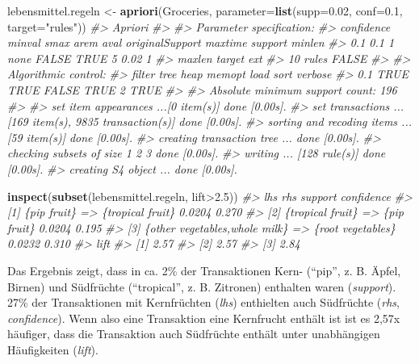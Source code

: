 \documentclass[12pt,]{book}
\makeatletter
\newenvironment{Shaded}{\begin{snugshade}}{\end{snugshade}}
\newcommand{\KeywordTok}[1]{\textcolor[rgb]{0.13,0.29,0.53}{\textbf{{#1}}}}
\newcommand{\DataTypeTok}[1]{\textcolor[rgb]{0.13,0.29,0.53}{{#1}}}
\newcommand{\FloatTok}[1]{\textcolor[rgb]{0.00,0.00,0.81}{{#1}}}
\newcommand{\StringTok}[1]{\textcolor[rgb]{0.31,0.60,0.02}{{#1}}}
\newcommand{\CommentTok}[1]{\textcolor[rgb]{0.56,0.35,0.01}{\textit{{#1}}}}
\newcommand{\NormalTok}[1]{{#1}}
\newenvironment{kframe}{%
\medskip{}
\setlength{\fboxsep}{.8em}
 \def\at@end@of@kframe{}%
 \ifinner\ifhmode%
  \def\at@end@of@kframe{\end{minipage}}%
  \begin{minipage}{\columnwidth}%
 \fi\fi%
 \def\FrameCommand##1{\hskip\@totalleftmargin \hskip-\fboxsep
 \colorbox{shadecolor}{##1}\hskip-\fboxsep
     \hskip-\linewidth \hskip-\@totalleftmargin \hskip\columnwidth}%
 \MakeFramed {\advance\hsize-\width
   \@totalleftmargin\z@ \linewidth\hsize
   \@setminipage}}%
 {\par\unskip\endMakeFramed%
 \at@end@of@kframe}
\renewenvironment{Shaded}{\begin{kframe}}{\end{kframe}}
\makeatother
\begin{document}
\begin{Shaded}
\begin{Highlighting}[]
\NormalTok{lebensmittel.regeln <-}\StringTok{ }\KeywordTok{apriori}\NormalTok{(Groceries, }
                               \DataTypeTok{parameter=}\KeywordTok{list}\NormalTok{(}\DataTypeTok{supp=}\FloatTok{0.02}\NormalTok{, }\DataTypeTok{conf=}\FloatTok{0.1}\NormalTok{,}
                                              \DataTypeTok{target=}\StringTok{"rules"}\NormalTok{))}
\CommentTok{#> Apriori}
\CommentTok{#> }
\CommentTok{#> Parameter specification:}
\CommentTok{#>  confidence minval smax arem  aval originalSupport maxtime support minlen}
\CommentTok{#>         0.1    0.1    1 none FALSE            TRUE       5    0.02      1}
\CommentTok{#>  maxlen target   ext}
\CommentTok{#>      10  rules FALSE}
\CommentTok{#> }
\CommentTok{#> Algorithmic control:}
\CommentTok{#>  filter tree heap memopt load sort verbose}
\CommentTok{#>     0.1 TRUE TRUE  FALSE TRUE    2    TRUE}
\CommentTok{#> }
\CommentTok{#> Absolute minimum support count: 196 }
\CommentTok{#> }
\CommentTok{#> set item appearances ...[0 item(s)] done [0.00s].}
\CommentTok{#> set transactions ...[169 item(s), 9835 transaction(s)] done [0.00s].}
\CommentTok{#> sorting and recoding items ... [59 item(s)] done [0.00s].}
\CommentTok{#> creating transaction tree ... done [0.00s].}
\CommentTok{#> checking subsets of size 1 2 3 done [0.00s].}
\CommentTok{#> writing ... [128 rule(s)] done [0.00s].}
\CommentTok{#> creating S4 object  ... done [0.00s].}
\end{Highlighting}
\end{Shaded}

\begin{Shaded}
\begin{Highlighting}[]
\KeywordTok{inspect}\NormalTok{(}\KeywordTok{subset}\NormalTok{(lebensmittel.regeln, lift>}\FloatTok{2.5}\NormalTok{))}
\CommentTok{#>     lhs                              rhs               support confidence}
\CommentTok{#> [1] \{pip fruit\}                   => \{tropical fruit\}  0.0204  0.270     }
\CommentTok{#> [2] \{tropical fruit\}              => \{pip fruit\}       0.0204  0.195     }
\CommentTok{#> [3] \{other vegetables,whole milk\} => \{root vegetables\} 0.0232  0.310     }
\CommentTok{#>     lift}
\CommentTok{#> [1] 2.57}
\CommentTok{#> [2] 2.57}
\CommentTok{#> [3] 2.84}
\end{Highlighting}
\end{Shaded}

Das Ergebnis zeigt, dass in ca. 2\% der Transaktionen Kern- (``pip'', z.
B. Äpfel, Birnen) und Südfrüchte (``tropical'', z. B. Zitronen)
enthalten waren (\emph{support}). 27\% der Transaktionen mit
Kernfrüchten (\emph{lhs}) enthielten auch Südfrüchte (\emph{rhs},
\emph{confidence}). Wenn also eine Transaktion eine Kernfrucht enthält
ist ist es 2,57x häufiger, dass die Transaktion auch Südfrüchte enthält
unter unabhängigen Häufigkeiten (\emph{lift}).
\end{document}
